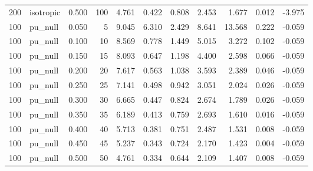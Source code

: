 \begin{tabular}{rlrrrrrrrrr}
200 & isotropic & 0.500 & 100 & 4.761 & 0.422 & 0.808 & 2.453 & 1.677 & 0.012 & -3.975 \\
100 & pu_null & 0.050 & 5 & 9.045 & 6.310 & 2.429 & 8.641 & 13.568 & 0.222 & -0.059 \\
100 & pu_null & 0.100 & 10 & 8.569 & 0.778 & 1.449 & 5.015 & 3.272 & 0.102 & -0.059 \\
100 & pu_null & 0.150 & 15 & 8.093 & 0.647 & 1.198 & 4.400 & 2.598 & 0.066 & -0.059 \\
100 & pu_null & 0.200 & 20 & 7.617 & 0.563 & 1.038 & 3.593 & 2.389 & 0.046 & -0.059 \\
100 & pu_null & 0.250 & 25 & 7.141 & 0.498 & 0.942 & 3.051 & 2.024 & 0.026 & -0.059 \\
100 & pu_null & 0.300 & 30 & 6.665 & 0.447 & 0.824 & 2.674 & 1.789 & 0.026 & -0.059 \\
100 & pu_null & 0.350 & 35 & 6.189 & 0.413 & 0.759 & 2.693 & 1.610 & 0.016 & -0.059 \\
100 & pu_null & 0.400 & 40 & 5.713 & 0.381 & 0.751 & 2.487 & 1.531 & 0.008 & -0.059 \\
100 & pu_null & 0.450 & 45 & 5.237 & 0.343 & 0.724 & 2.170 & 1.423 & 0.004 & -0.059 \\
100 & pu_null & 0.500 & 50 & 4.761 & 0.334 & 0.644 & 2.109 & 1.407 & 0.008 & -0.059 \\
\bottomrule
\end{tabular}
